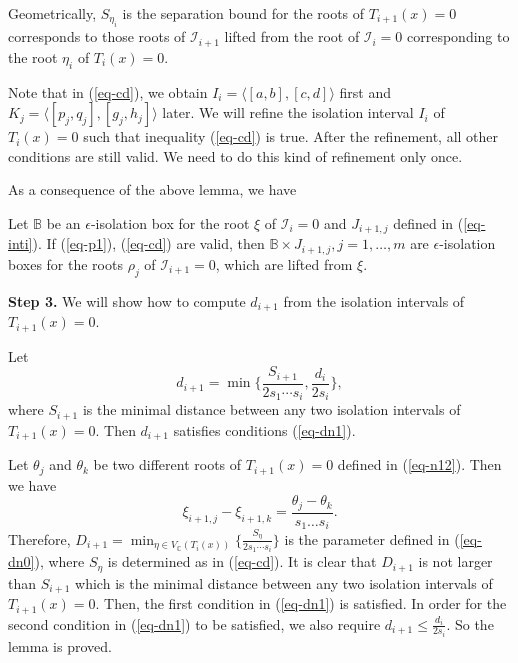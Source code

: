 \documentclass[amsthm]{JSC_LaTex_2007_Mar_12/elsart}
\def\bref#1{(\ref{#1})}
\def\C{{\mathbb{C}}}
\def\IS{{\mathcal{I}}}
\begin{document}
Geometrically, $S_{\eta_i}$ is the separation bound for the roots of
$T_{i+1}(x)=0$ corresponds to those roots of $\IS_{i+1}$ lifted from
the root of $\IS_i=0$ corresponding to the root $\eta_i$ of
$T_i(x)=0$.

\begin{rem}\label{rem-2} Note that in \bref{eq-cd}, we obtain
$I_i=\langle[a,b],[c,d]\rangle$ first and
$K_j=\langle[p_j,q_j],[g_j,h_j]\rangle$ later. We will refine the
isolation interval $I_i$ of $T_i(x)=0$ such that inequality
\bref{eq-cd} is true. After the refinement, all other conditions are
still valid. We need to do this kind of refinement only once.
\end{rem}

As a consequence of the above lemma, we have
\begin{cor}\label{cor-b2}
Let $\mathbb{B}$ be an $\epsilon$-isolation box for the root $\xi$
of $\IS_{i}=0$ and $J_{i+1,j}$ defined in \bref{eq-inti}. If
\bref{eq-p1}, \bref{eq-cd} are valid, then $\mathbb{B}\times
J_{i+1,j},j=1,\ldots,m$ are $\epsilon$-isolation boxes for the roots
$\rho_j$ of $\IS_{i+1}=0$, which are lifted from $\xi$.
\end{cor}


{\bf Step 3.} We will show how to compute $d_{i+1}$ from the
isolation intervals of $T_{i+1}(x)=0$.

\begin{lem}\label{lem-di}
Let
\begin{equation}\label{eq-di}
d_{i+1}=\min\{\frac{S_{i+1}}{2s_1\cdots s_i}, \frac{d_i}{2s_i}\},
\end{equation}
where $S_{i+1}$ is the minimal distance between any two isolation
intervals of $T_{i+1}(x)=0$. Then $d_{i+1}$ satisfies conditions
\bref{eq-dn1}.
\end{lem}
\begin{pf}
Let $\theta_j$ and $\theta_k$ be two different roots of
$T_{i+1}(x)=0$ defined in \bref{eq-n12}. Then we have
$$\xi_{i+1,j}-\xi_{i+1,k}=\frac{\theta_j-\theta_k}{s_1\ldots s_{i}}.$$
Therefore,  $D_{i+1}= \min_{\eta\in V_{\C}(T_{i}(x))}\{
\frac{S_{\eta}}{2s_1\cdots s_i}\}$ is the parameter defined in
\bref{eq-dn0}, where $S_{\eta}$ is determined as in \bref{eq-cd}. It
is clear that $D_{i+1}$ is not larger than $S_{i+1}$ which is the
minimal distance between any two isolation intervals of
$T_{i+1}(x)=0$. Then, the first condition in \bref{eq-dn1} is
satisfied.
In order for the second condition in \bref{eq-dn1} to be satisfied,
we also require $d_{i+1}\le \frac{d_i}{2 s_i}.$ So the lemma is
proved.
\end{pf}
\end{document}
